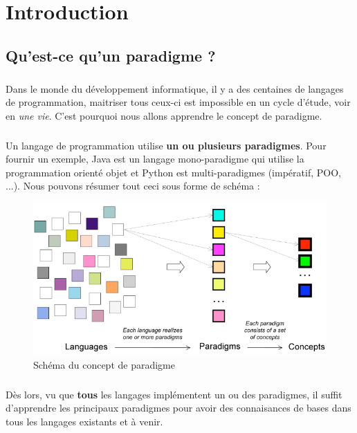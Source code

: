 \chapter{Introduction}
\minitoc
\newpage

\section{Qu'est-ce qu'un paradigme ?}

  \paragraph{}Dans le monde du développement informatique, il y a des centaines de langages de programmation, maitriser
  tous ceux-ci est impossible en un cycle d'étude, voir en \textit{une vie}. C'est pourquoi nous allons apprendre le 
  concept de {\color{danger} paradigme}.

  \paragraph{}Un langage de programmation utilise \textbf{un ou plusieurs paradigmes}. Pour fournir un exemple, Java est
  un langage mono-paradigme qui utilise la programmation orienté objet et Python est multi-paradigmes 
  (impératif, POO, ...). Nous pouvons résumer tout ceci sous forme de schéma :

  \begin{figure}[H]
    \centering
    \includegraphics[width=\textwidth]{pictures/chapter1/intro-schema-langagues-paradigms.png}
    \caption{Schéma du concept de paradigme}
  \end{figure}

  \paragraph{}Dès lors, vu que \textbf{tous} les langages implémentent un ou des paradigmes, il suffit d'apprendre les
  principaux paradigmes pour avoir des connaisances de bases dans tous les langages existants et à venir.

